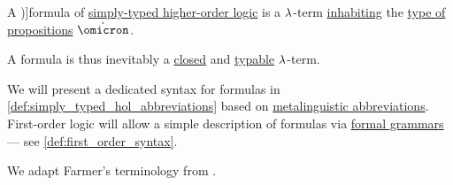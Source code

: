 \begin{definition}\label{def:simply_typed_hol_formula}\mimprovised
  A \term[en=formula (\cite[270]{Farmer2008STTVirtues})]{formula} of \hyperref[def:simply_typed_hol]{simply-typed higher-order logic} is a \( {\mathrm \lambda} \)-term \hyperref[def:type_habitation]{inhabiting} the \hyperref[def:simply_typed_hol_signature/types]{type of propositions} \( \syn\omicron \).
\end{definition}
\begin{comments}
  \item A formula is thus inevitably a \hyperref[def:lambda_combinator]{closed} and \hyperref[def:typability]{typable} \( {\mathrm \lambda} \)-term.

  \item We will present a dedicated syntax for formulas in \cref{def:simply_typed_hol_abbreviations} based on \hyperref[con:metalingual_abbreviation]{metalinguistic abbreviations}. First-order logic will allow a simple description of formulas via \hyperref[def:formal_grammar]{formal grammars} --- see \ref{def:first_order_syntax}.

  \item We adapt Farmer's terminology from \cite[270]{Farmer2008STTVirtues}.
\end{comments}

